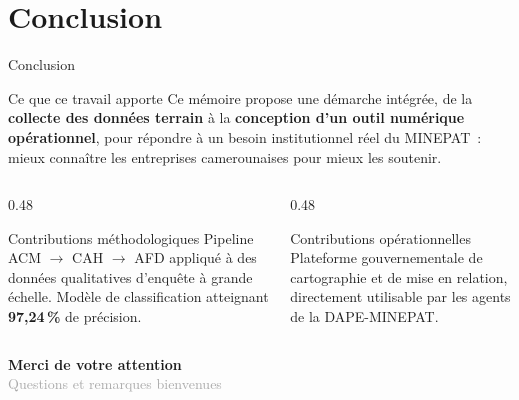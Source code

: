 \documentclass[aspectratio=169, 10pt]{beamer}
\begin{document}
\section{Conclusion}

\begin{frame}{Conclusion}
    \begin{block}{Ce que ce travail apporte}
        Ce mémoire propose une démarche intégrée, de la
        \textbf{collecte des données terrain} à la
        \textbf{conception d'un outil numérique opérationnel},
        pour répondre à un besoin institutionnel réel du MINEPAT~:
        mieux connaître les entreprises camerounaises pour
        mieux les soutenir.
    \end{block}
    \vspace{10pt}
    \begin{columns}[T]
        \begin{column}{0.48\textwidth}
            \begin{exampleblock}{Contributions méthodologiques}
                Pipeline ACM $\to$ CAH $\to$ AFD appliqué à des
                données qualitatives d'enquête à grande échelle.
                Modèle de classification atteignant
                \textbf{97,24\,\%} de précision.
            \end{exampleblock}
        \end{column}
        \begin{column}{0.48\textwidth}
            \begin{exampleblock}{Contributions opérationnelles}
                Plateforme gouvernementale de cartographie
                et de mise en relation, directement utilisable
                par les agents de la DAPE-MINEPAT.
            \end{exampleblock}
        \end{column}
    \end{columns}
    \vspace{12pt}
    \centering
    \Large\textcolor{primary}{\textbf{Merci de votre attention}}\\[6pt]
    \normalsize\textcolor{darkgray}{Questions et remarques bienvenues}
\end{frame}
\end{document}
